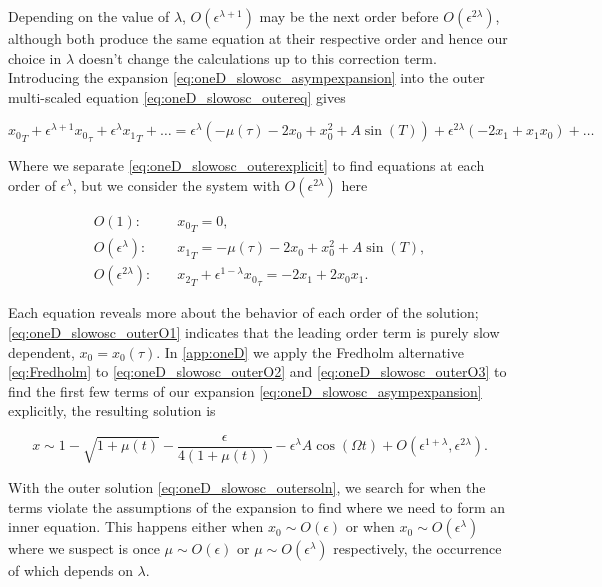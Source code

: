 Depending on the value of $\lambda$, $O(\epsilon^{\lambda+1})$ may be the next order before $O(\epsilon^{2\lambda})$, although both produce the same equation at their respective order and hence our choice in $\lambda$ doesn't change the calculations up to this correction term. Introducing the expansion \eqref{eq:oneD_slowosc_asympexpansion} into the outer multi-scaled equation \eqref{eq:oneD_slowosc_outereq} gives 

\begin{equation}\label{eq:oneD_slowosc_outerexplicit}
{x_0}_T+\epsilon^{\lambda+1}{x_0}_\tau+\epsilon^\lambda {x_1}_T+\ldots=\epsilon^\lambda(-\mu(\tau)-2x_0+x_0^2+A\sin(T))+\epsilon^{2\lambda}(-2x_1+x_1x_0)+\ldots
\end{equation}

Where we separate \eqref{eq:oneD_slowosc_outerexplicit} to find equations at each order of $\epsilon^\lambda$, but we consider the system with $O(\epsilon^{2\lambda})$ here

\begin{align}
\label{eq:oneD_slowosc_outerO1}
O(1):\quad & {x_0}_T=0, \\
\label{eq:oneD_slowosc_outerO2}
O(\epsilon^\lambda):\quad&  {x_1}_T=-\mu(\tau)-2x_0+x_0^2+A\sin(T),\\
\label{eq:oneD_slowosc_outerO3}
O(\epsilon^{2\lambda}):\quad& {x_2}_T+\epsilon^{1-\lambda}{x_0}_\tau= -2x_1+2x_0x_1.
\end{align}

Each equation reveals more about the behavior of each order of the solution; \eqref{eq:oneD_slowosc_outerO1} indicates that the leading order term is purely slow dependent, $x_0=x_0(\tau)$. In \autoref{app:oneD} we apply the Fredholm alternative \eqref{eq:Fredholm} to \eqref{eq:oneD_slowosc_outerO2} and \eqref{eq:oneD_slowosc_outerO3} to find the first few terms of our expansion \eqref{eq:oneD_slowosc_asympexpansion} explicitly, the resulting solution is

\begin{equation}\label{eq:oneD_slowosc_outersoln}
x\sim 1-\sqrt{1+\mu(t)}-\frac{\epsilon}{4(1+\mu(t))}-\epsilon^\lambda A \cos(\Omega t)+O(\epsilon^{1+\lambda},\epsilon^{2\lambda}).
\end{equation}

With the outer solution \eqref{eq:oneD_slowosc_outersoln}, we search for when the terms violate the assumptions of the expansion to find where we need to form an inner equation. This happens either when $x_0\sim O(\epsilon)$ or when $x_0\sim O(\epsilon^\lambda)$ where we suspect is once $\mu\sim O(\epsilon)$ or $\mu\sim O(\epsilon^\lambda)$ respectively, the occurrence of which depends on $\lambda$. 

